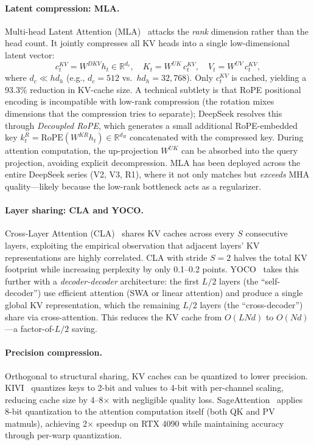 \documentclass[11pt,a4paper]{article}
\begin{document}
\paragraph{Latent compression: MLA.}
Multi-head Latent Attention (MLA)~\cite{deepseekv2_2024_mla} attacks the \emph{rank} dimension rather than the head count. It jointly compresses all KV heads into a single low-dimensional latent vector:
\begin{equation}
c_t^{KV} = W^{DKV} h_t \in \mathbb{R}^{d_c}, \quad K_t = W^{UK}\, c_t^{KV}, \quad V_t = W^{UV}\, c_t^{KV},
\label{eq:mla}
\end{equation}
where $d_c \ll hd_h$ (e.g., $d_c = 512$ vs.\ $hd_h = 32{,}768$). Only $c_t^{KV}$ is cached, yielding a 93.3\% reduction in KV-cache size. A technical subtlety is that RoPE positional encoding is incompatible with low-rank compression (the rotation mixes dimensions that the compression tries to separate); DeepSeek resolves this through \emph{Decoupled RoPE}, which generates a small additional RoPE-embedded key $k^R_t = \text{RoPE}(W^{KR} h_t) \in \mathbb{R}^{d_R}$ concatenated with the compressed key. During attention computation, the up-projection $W^{UK}$ can be absorbed into the query projection, avoiding explicit decompression. MLA has been deployed across the entire DeepSeek series (V2, V3, R1), where it not only matches but \emph{exceeds} MHA quality---likely because the low-rank bottleneck acts as a regularizer.

\paragraph{Layer sharing: CLA and YOCO.}
Cross-Layer Attention (CLA)~\cite{brandon2024reducing} shares KV caches across every $S$ consecutive layers, exploiting the empirical observation that adjacent layers' KV representations are highly correlated. CLA with stride $S = 2$ halves the total KV footprint while increasing perplexity by only 0.1--0.2 points. YOCO~\cite{sun2024yoco} takes this further with a \emph{decoder-decoder} architecture: the first $L/2$ layers (the ``self-decoder'') use efficient attention (SWA or linear attention) and produce a single global KV representation, which the remaining $L/2$ layers (the ``cross-decoder'') share via cross-attention. This reduces the KV cache from $O(LNd)$ to $O(Nd)$---a factor-of-$L/2$ saving.

\paragraph{Precision compression.}
Orthogonal to structural sharing, KV caches can be quantized to lower precision. KIVI~\cite{liu2024kivi} quantizes keys to 2-bit and values to 4-bit with per-channel scaling, reducing cache size by 4--8$\times$ with negligible quality loss. SageAttention~\cite{zhang2024sageattention} applies 8-bit quantization to the attention computation itself (both QK and PV matmuls), achieving 2$\times$ speedup on RTX 4090 while maintaining accuracy through per-warp quantization.
\end{document}
